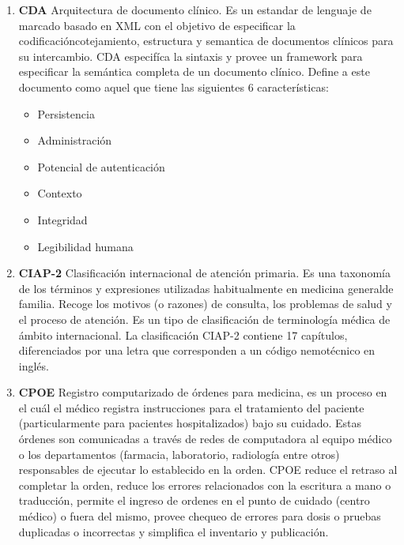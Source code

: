 {\begin{enumerate}
    \item\textbf{CDA} Arquitectura de documento clínico. Es un estandar de lenguaje de marcado basado en XML con el objetivo de especificar la codificación\/cotejamiento, estructura y semantica de documentos clínicos para su intercambio. CDA especifíca la sintaxis y provee un framework para especificar la semántica completa de un documento clínico. Define a este documento como aquel que tiene las siguientes 6 características:
      \begin{itemize}
          \item Persistencia
          \item Administración
          \item Potencial de autenticación
          \item Contexto
    	  \item Integridad
   		  \item Legibilidad humana
      \end{itemize}
      
    \item\textbf{CIAP-2} Clasificación internacional de atención primaria. Es una taxonomía de los términos y expresiones utilizadas habitualmente en medicina general\/de familia. Recoge los motivos (o razones) de consulta, los problemas de salud y el proceso de atención. Es un tipo de clasificación de terminología médica de ámbito internacional. La clasificación CIAP-2 contiene 17 capítulos, diferenciados por una letra que corresponden a un código nemotécnico en inglés.
    
    \item\textbf{CPOE} Registro computarizado de órdenes para medicina, es un proceso en el cuál el médico registra instrucciones para el tratamiento del paciente (particularmente para pacientes hospitalizados) bajo su cuidado. Estas órdenes son comunicadas a través de redes de computadora al equipo médico o los departamentos (farmacia, laboratorio, radiología entre otros) responsables de ejecutar lo establecido en la orden. CPOE reduce el retraso al completar la orden, reduce los errores relacionados con la escritura a mano o traducción, permite el ingreso de ordenes en el punto de cuidado (centro médico) o fuera del mismo, provee chequeo de errores para dosis o pruebas duplicadas o incorrectas y simplifica el inventario y publicación.
    

\end{enumerate}}

